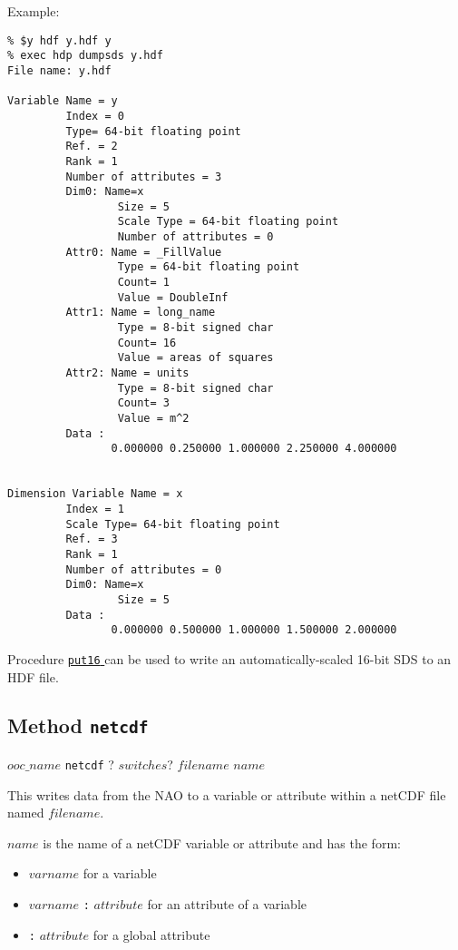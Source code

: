 Example:
  \begin{verbatim}
% $y hdf y.hdf y
% exec hdp dumpsds y.hdf
File name: y.hdf 

Variable Name = y
         Index = 0
         Type= 64-bit floating point
         Ref. = 2
         Rank = 1
         Number of attributes = 3
         Dim0: Name=x
                 Size = 5
                 Scale Type = 64-bit floating point
                 Number of attributes = 0
         Attr0: Name = _FillValue
                 Type = 64-bit floating point 
                 Count= 1
                 Value = DoubleInf 
         Attr1: Name = long_name
                 Type = 8-bit signed char 
                 Count= 16
                 Value = areas of squares
         Attr2: Name = units
                 Type = 8-bit signed char 
                 Count= 3
                 Value = m^2
         Data : 
                0.000000 0.250000 1.000000 2.250000 4.000000 


Dimension Variable Name = x
         Index = 1
         Scale Type= 64-bit floating point
         Ref. = 3
         Rank = 1
         Number of attributes = 0
         Dim0: Name=x
                 Size = 5
         Data : 
                0.000000 0.500000 1.000000 1.500000 2.000000 
\end{verbatim}

  

Procedure 
  \href{bin-io.html\#put16}{ \texttt{put16} } can be used to write an automatically-scaled 16-bit SDS to an
  HDF file.
  \subsection{
    \label{netcdf}Method \texttt{netcdf}
  }

  $ooc\_name$ 
  \texttt{netcdf} ?
  $switches$? 
  $filename$ 
  $name$
  

This writes data from the NAO to a variable or attribute within a
  netCDF file named 
  $filename$.
  


  $name$ is the name of a netCDF variable or attribute and has
  the form:
  \begin{itemize}
    \item 
    $varname$ for a variable
    \item 
    $varname$
    \texttt{:}
    $attribute$ for an attribute of a variable
    \item 
    \texttt{:}
    $attribute$ for a global attribute
    \\
  \end{itemize}
  


